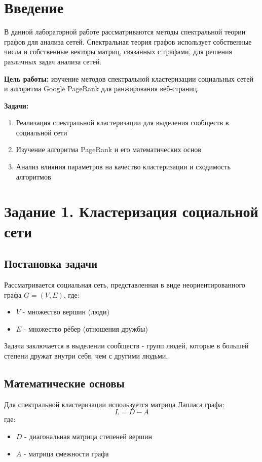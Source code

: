 \section*{Введение}

В данной лабораторной работе рассматриваются методы спектральной теории графов для анализа сетей. Спектральная теория графов использует собственные числа и собственные векторы матриц, связанных с графами, для решения различных задач анализа сетей.

\textbf{Цель работы:} изучение методов спектральной кластеризации социальных сетей и алгоритма Google PageRank для ранжирования веб-страниц.

\textbf{Задачи:}
\begin{enumerate}
    \item Реализация спектральной кластеризации для выделения сообществ в социальной сети
    \item Изучение алгоритма PageRank и его математических основ
    \item Анализ влияния параметров на качество кластеризации и сходимость алгоритмов
\end{enumerate}

\section*{Задание 1. Кластеризация социальной сети}

\subsection*{Постановка задачи}

Рассматривается социальная сеть, представленная в виде неориентированного графа $G = (V, E)$, где:
\begin{itemize}
    \item $V$ - множество вершин (люди)
    \item $E$ - множество рёбер (отношения дружбы)
\end{itemize}

Задача заключается в выделении сообществ - групп людей, которые в большей степени дружат внутри себя, чем с другими людьми.

\subsection*{Математические основы}

Для спектральной кластеризации используется матрица Лапласа графа:
\begin{equation}
L = D - A
\end{equation}
где:
\begin{itemize}
    \item $D$ - диагональная матрица степеней вершин
    \item $A$ - матрица смежности графа
\end{itemize}

